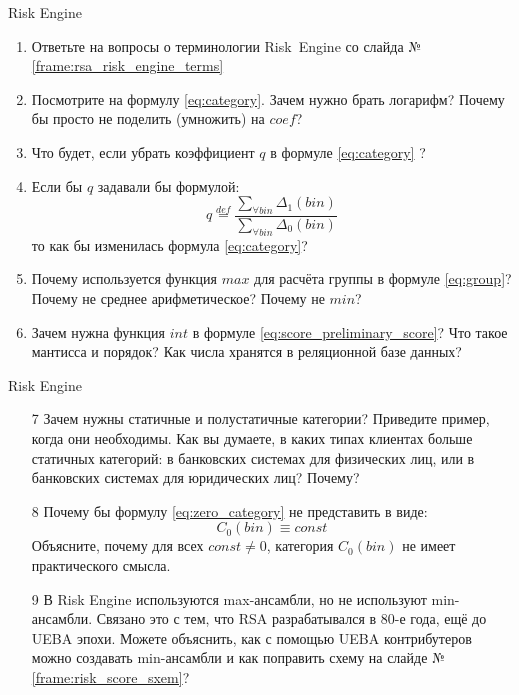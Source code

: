 \begin{frame}{Risk Engine}
	\small
	\begin{enumerate}
		\item 	Ответьте на вопросы о терминологии \mbox{Risk Engine}
		со слайда №\ref{frame:rsa_risk_engine_terms}
		\item Посмотрите на формулу \eqref{eq:category}. Зачем нужно брать логарифм?
		Почему бы просто не поделить (умножить) на $coef$?  
		\item Что будет, если убрать коэффициент $q$ в формуле \eqref{eq:category} ?
		\item Если бы $q$ задавали бы формулой:
		\begin{equation*}
		q \stackrel{def}{=} \frac{\sum_{\forall bin} \Delta_1(bin)}{\sum_{\forall bin} \Delta_0(bin)}
		\end{equation*}
		то как бы изменилась формула \eqref{eq:category}?
		\item Почему используется функция $max$ для расчёта группы в формуле \eqref{eq:group}?
		Почему не среднее арифметическое? Почему не $min$?
		\item Зачем нужна функция $int$ в формуле \eqref{eq:score_preliminary_score}? Что 
		такое мантисса и порядок? Как числа хранятся в реляционной базе данных?
		
	\end{enumerate}
\end{frame}

\begin{frame}{Risk Engine}
	\small
	\begin{enumerate}
		\item[7] Зачем нужны статичные и полустатичные категории? Приведите пример, когда они необходимы.
		Как вы думаете, в каких типах клиентах больше статичных категорий: в банковских системах для физических лиц, или в банковских системах для юридических лиц? Почему?
		\item[8] Почему бы формулу \eqref{eq:zero_category} не представить в виде:
		\begin{equation*}
		C_0 (bin) \equiv const
		\end{equation*}
		Объясните, почему для всех $const \neq 0$, категория $C_0 (bin)$ не имеет практического смысла.
		\item[9] В Risk Engine используются max-ансамбли, но не используют min-ансамбли. 
		Связано это с тем, что RSA разрабатывался в 80-е года, ещё до UEBA эпохи. 
		Можете объяснить, как с помощью UEBA контрибутеров можно создавать min-ансамбли 
		и как поправить схему на слайде №\ref{frame:risk_score_sxem}?
	\end{enumerate}
\end{frame}





